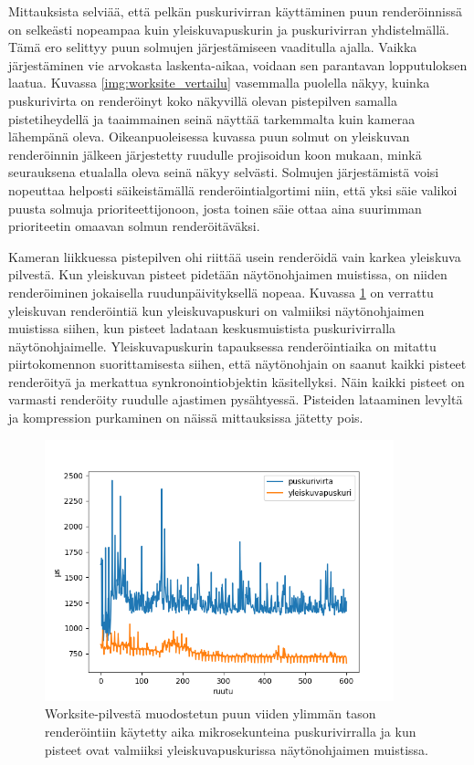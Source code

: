 Mittauksista selviää, että pelkän puskurivirran käyttäminen puun renderöinnissä on selkeästi nopeampaa kuin yleiskuvapuskurin ja puskurivirran yhdistelmällä. Tämä ero selittyy puun solmujen järjestämiseen vaaditulla ajalla. Vaikka järjestäminen vie arvokasta laskenta-aikaa, voidaan sen parantavan lopputuloksen laatua. Kuvassa \ref{img:worksite_vertailu} vasemmalla puolella näkyy, kuinka puskurivirta on renderöinyt koko näkyvillä olevan pistepilven samalla pistetiheydellä ja taaimmainen seinä näyttää tarkemmalta kuin kameraa lähempänä oleva. Oikeanpuoleisessa kuvassa puun solmut on yleiskuvan renderöinnin jälkeen järjestetty ruudulle projisoidun koon mukaan, minkä seurauksena etualalla oleva seinä näkyy selvästi. Solmujen järjestämistä voisi nopeuttaa helposti säikeistämällä renderöintialgortimi niin, että yksi säie valikoi puusta solmuja prioriteettijonoon, josta toinen säie ottaa aina suurimman prioriteetin omaavan solmun renderöitäväksi.

Kameran liikkuessa pistepilven ohi riittää usein renderöidä vain karkea yleiskuva pilvestä. Kun yleiskuvan pisteet pidetään näytönohjaimen muistissa, on niiden renderöiminen jokaisella ruudunpäivityksellä nopeaa. Kuvassa \ref{ws_ovw} on verrattu yleiskuvan renderöintiä kun yleiskuvapuskuri on valmiiksi näytönohjaimen muistissa siihen, kun pisteet ladataan keskusmuistista puskurivirralla näytönohjaimelle. Yleiskuvapuskurin tapauksessa renderöintiaika on mitattu piirtokomennon suorittamisesta siihen, että näytönohjain on saanut kaikki pisteet renderöityä ja merkattua synkronointiobjektin käsitellyksi. Näin kaikki pisteet on varmasti renderöity ruudulle ajastimen pysähtyessä. Pisteiden lataaminen levyltä ja kompression purkaminen on näissä mittauksissa jätetty pois.

\begin{figure}[h]
    \centering
    \includegraphics[width=0.9\textwidth]{tuloksia/worksite_overview.png}
    \caption{Worksite-pilvestä muodostetun puun viiden ylimmän tason renderöintiin käytetty aika mikrosekunteina puskurivirralla ja kun pisteet ovat valmiiksi yleiskuvapuskurissa näytönohjaimen muistissa.}
    \label{ws_ovw}
\end{figure}


